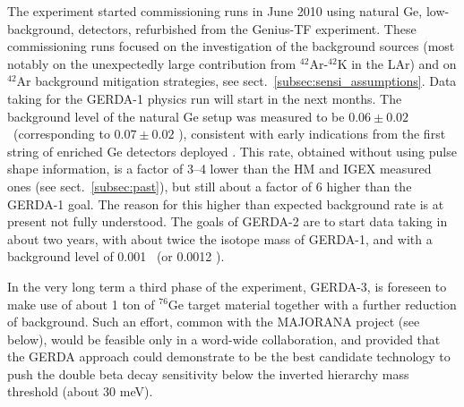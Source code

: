 The experiment started commissioning runs in June 2010 using natural Ge, low-background, detectors, refurbished from the Genius-TF experiment. These commissioning runs focused on the investigation of the background sources (most notably on the unexpectedly large contribution from $^{42}$Ar-$^{42}$K in the LAr) and on $^{42}$Ar background mitigation strategies, see sect.~\ref{subsec:sensi_assumptions}. Data taking for the GERDA-1 physics run will start in the next months. The background level of the natural Ge setup was measured to be $0.06\pm 0.02$ \ckky\ (corresponding to $0.07\pm 0.02$ \ckkbby ), consistent with early indications from the first string of enriched Ge detectors deployed \cite{Cattadori:2012fy}. This rate, obtained without using pulse shape information, is a factor of 3--4 lower than the HM and IGEX measured ones (see sect.~\ref{subsec:past}), but still about a factor of 6 higher than the GERDA-1 goal. The reason for this higher than expected background rate is at present not fully understood. The goals of GERDA-2 are to start data taking in about two years, with about twice the isotope mass of GERDA-1, and with a background level of 0.001 \ckky\ (or 0.0012 \ckkbby ).

In the very long term a third phase of the experiment, GERDA-3, is foreseen to make use of about 1 ton of $^{76}$Ge target material together with a further reduction of background. Such an effort, common with the MAJORANA project (see below), would be feasible only in a word-wide collaboration, and provided that the GERDA approach could demonstrate to be the best candidate technology to push the double beta decay sensitivity below the inverted hierarchy mass threshold (about 30 meV). 
